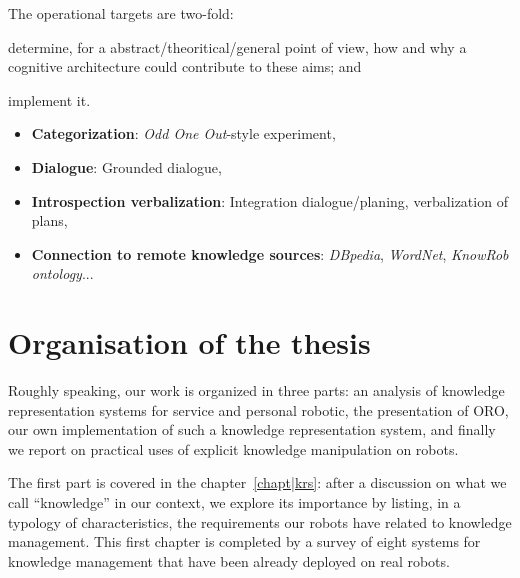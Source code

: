The operational targets are two-fold:

\begin{inparaenum}

	\item determine, for a abstract/theoritical/general point of view, how and
	why a cognitive architecture could contribute to these aims; and

	\item implement it.

\end{inparaenum}

\begin{itemize}
	\item \textbf{Categorization}: \emph{Odd One Out}-style experiment,
	\item \textbf{Dialogue}: Grounded dialogue,
	\item \textbf{Introspection verbalization}: Integration dialogue/planing, verbalization of plans,
	\item \textbf{Connection to remote knowledge sources}: \emph{DBpedia}, \emph{WordNet}, \emph{KnowRob ontology}...
\end{itemize}



\section{Organisation of the thesis}

Roughly speaking, our work is organized in three parts: an analysis of
knowledge representation systems for service and personal robotic, the
presentation of ORO, our own implementation of such a knowledge representation
system, and finally we report on practical uses of explicit knowledge
manipulation on robots.

The first part is covered in the chapter~\ref{chapt|krs}: after a discussion on
what we call ``knowledge'' in our context, we explore its importance by
listing, in a typology of characteristics, the requirements our robots have
related to knowledge management. This first chapter is completed by a survey of
eight systems for knowledge management that have been already deployed on real robots.

